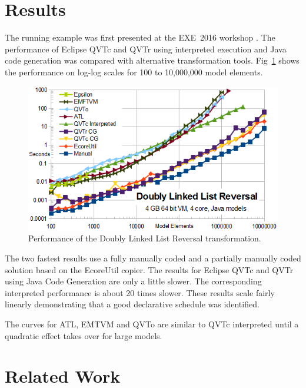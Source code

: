 \documentclass{llncs}
\begin{document}
\section{Results}\label{Results}

The running example was first presented at the EXE~2016 workshop \cite{Willink-EXE2016}. The performance of Eclipse QVTc and QVTr using interpreted execution and Java code generation was compared with alternative transformation tools. Fig~\ref{fig:DoublyLinkedListReversalPerformance} shows the performance on log-log scales for 100 to 10,000,000 model elements.

\begin{figure}[h]
	\centering
	\includegraphics[width=1.0\textwidth]{DoublyLinkedListReversalPerformance.png}
	\caption{Performance of the Doubly Linked List Reversal transformation.}
	\label{fig:DoublyLinkedListReversalPerformance}
\end{figure}

The two fastest results use a fully manually coded and a partially manually coded solution based on the EcoreUtil copier. The results for Eclipse QVTc and QVTr using Java Code Generation are only a little slower.
The corresponding interpreted performance is about 20 times slower. These results scale fairly linearly demonstrating that a good declarative schedule was identified.

The curves for ATL, EMTVM and QVTo are similar to QVTc interpreted until a quadratic effect takes over for large models.

\section{Related Work}\label{Related Work}
\end{document}
